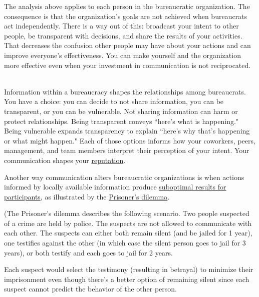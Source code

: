 The analysis above applies to each person in the bureaucratic organization.
The consequence is that the organization's goals are not achieved when bureaucrats act independently. 
There is a way out of this: broadcast your intent to other people, be transparent with decisions, and share the results of your activities. That decreases the confusion other people may have about your actions and can improve everyone's effectiveness. You can make yourself and the organization more effective even when your investment in communication is not reciprocated.

\ \\

Information within a bureaucracy shapes the relationships among bureaucrats. You have a choice: you can decide to not share information, you can be transparent, or you can be vulnerable.  
Not sharing information can harm or protect relationships. 
Being transparent conveys ``here's what is happening." Being vulnerable expands transparency to explain ``here's why that's happening or what might happen."
Each of those options informs how your coworkers, peers, management, and team members interpret their perception of your intent. Your communication shapes your \hyperref[sec:reputation]{reputation}.


Another way communication alters bureaucratic organizations is when actions informed by locally available information produce \hyperref[sec:failure-to-comm]{suboptimal results for participants}, 
%
as illustrated by the
\href{https://en.wikipedia.org/wiki/Prisoner\%27s\_dilemma}{Prisoner's dilemma}. 

\begin{mdframed}[frametitle={Prisoner's Dilemma},frametitlerule=true,frametitlealignment=\centering]
(The \gls{Prisoner's dilemma} describes the following scenario. Two people suspected of a crime are held by police. The suspects are not allowed to communicate with each other. The suspects can either both remain silent (and be jailed for 1 year), one testifies against the other (in which case the silent person goes to jail for 3 years), or both testify and each goes to jail for 2 years.

Each suspect would select the testimony (resulting in betrayal) to minimize their imprisonment even though there's a better option of remaining silent since each suspect cannot predict the behavior of the other person. 
\label{prisoners_dilemma_explanation}
\end{mdframed}

